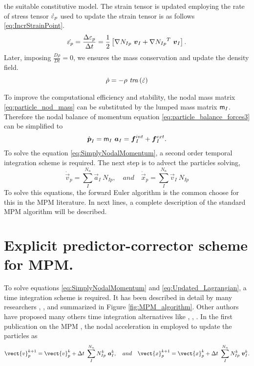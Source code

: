 the suitable constitutive model. The strain tensor is updated employing the rate of stress tensor $\dot{ \mathsf{\varepsilon}}_{p}$ used to update the
strain tensor is as follows \eqref{eq:IncrStrainPoint}.
\begin{equation}
  \label{eq:IncrStrainPoint}
  \dot{\tens{\varepsilon}_{p}} = \frac{\Delta
    \tens{\varepsilon}_{p}}{\Delta t} =
  \frac{1}{2}\left[\Grad{N_{Ip}}\ \vec{v}_{I} + \Grad{N_{Ip}}^T\
    \vec{v}_{I}\right].
\end{equation}
Later, imposing $\frac{D \rho}{D t} = 0$, we ensures the mass
conservation and update the density field.
\begin{equation}
  \label{eq:MassConservation}
\dot{\rho} = - \rho\ \mathit{tra} \left( \dot{\mathsf{\varepsilon}} \right)
\end{equation}

To improve the computational efficiency and stability, the nodal mass matrix
\eqref{eq:particle_nod_mass} can be substituted by the lumped mass
matrix $\mathsf{m}_I$. Therefore the nodal balance of momentum equation \eqref{eq:particle_balance_forces3} can be simplified to
\begin{equation}
  \label{eq:SimplyNodalMomentum}
  \dot{\vec{p}}_{I} = \tens{m}_I\ \vec{a}_{I} = \vec{f}_{I}^{int} + \vec{f}_{I}^{ext}.
\end{equation}
To solve the equation \eqref{eq:SimplyNodalMomentum}, a second order
temporal integration scheme is required. The next step is to advect
the particles solving,
\begin{equation}
  \label{eq:Updated_Lagrangian}
  \dot{\vec{v}}_p = \sum^{N_n}_{I}\vec{a}_{I}\ N_{Ip},\quad and\quad \dot{\vec{x}}_{p} = \sum^{N_n}_{I}\vec{v}_{I}\ N_{Ip}  
\end{equation}
To solve this equations, the forward Euler algorithm is the common
choose for this in the MPM literature. In next lines, a complete
description of the standard MPM algorithm will be described.

\section{Explicit predictor-corrector scheme for MPM.}
\label{sec:epc-algor-mpm}

To solve equations \eqref{eq:SimplyNodalMomentum} and
\eqref{eq:Updated_Lagrangian}, a time integration scheme is
required. It has been described in detail by many researchers
\cite{Sulsky1994}, \cite{Bardenhagen2002}, \cite{thesis_Andersen_2009} and summarized
in Figure \ref{fig:MPM_algorithm}. Other authors have proposed many
others time integration alternatives like
\cite{Guilkey2003}, \cite{Tran2019e}, \cite{Charlton2017}. In the first publication on
the MPM \cite{Sulsky1994}, the nodal acceleration in employed to
update the particles as
\begin{equation}
  \label{eq:Sulsky-1994-UL-v-x}
  \vect{v}_p^{k+1} = \vect{v}_p^{k} + \Delta t\
  \sum^{N_n}_{I}N_{Ip}^{k}\ \vec{a}_{I}^{k},\quad and\quad
  \vect{x}_p^{k+1} = \vect{x}_p^{k} + \Delta t\ \sum^{N_n}_{I}N_{Ip}^{k}\ \vec{v}_{I}^{k}.
\end{equation}


